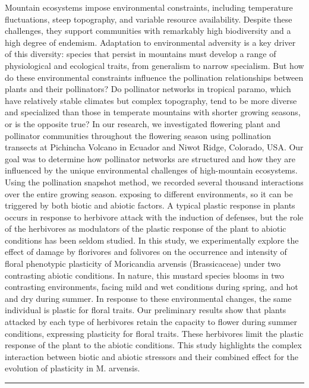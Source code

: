 \documentclass[
  letterpaper,
  DIV=11,
  numbers=noendperiod]{scrartcl}
\begin{document}
Mountain ecosystems impose environmental constraints, including
temperature fluctuations, steep topography, and variable resource
availability. Despite these challenges, they support communities with
remarkably high biodiversity and a high degree of endemism. Adaptation
to environmental adversity is a key driver of this diversity: species
that persist in mountains must develop a range of physiological and
ecological traits, from generalism to narrow specialism. But how do
these environmental constraints influence the pollination relationships
between plants and their pollinators? Do pollinator networks in tropical
paramo, which have relatively stable climates but complex topography,
tend to be more diverse and specialized than those in temperate
mountains with shorter growing seasons, or is the opposite true? In our
research, we investigated flowering plant and pollinator communities
throughout the flowering season using pollination transects at Pichincha
Volcano in Ecuador and Niwot Ridge, Colorado, USA. Our goal was to
determine how pollinator networks are structured and how they are
influenced by the unique environmental challenges of high-mountain
ecosystems. Using the pollination snapshot method, we recorded several
thousand interactions over the entire growing season. exposing to
different environments, so it can be triggered by both biotic and
abiotic factors. A typical plastic response in plants occurs in response
to herbivore attack with the induction of defenses, but the role of the
herbivores as modulators of the plastic response of the plant to abiotic
conditions has been seldom studied. In this study, we experimentally
explore the effect of damage by florivores and folivores on the
occurrence and intensity of floral phenotypic plasticity of Moricandia
arvensis (Brassicaceae) under two contrasting abiotic conditions. In
nature, this mustard species blooms in two contrasting environments,
facing mild and wet conditions during spring, and hot and dry during
summer. In response to these environmental changes, the same individual
is plastic for floral traits. Our preliminary results show that plants
attacked by each type of herbivores retain the capacity to flower during
summer conditions, expressing plasticity for floral traits. These
herbivores limit the plastic response of the plant to the abiotic
conditions. This study highlights the complex interaction between biotic
and abiotic stressors and their combined effect for the evolution of
plasticity in M. arvensis.

\begin{center}\rule{0.5\linewidth}{0.5pt}\end{center}
\end{document}

